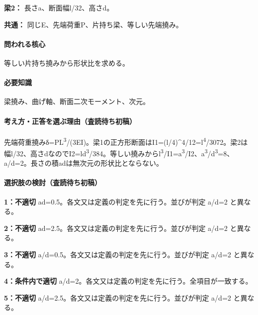 \noindent\textbf{梁2：} 長さa、断面幅l/32、高さd。\par

\noindent\textbf{共通：} 同じE、先端荷重P、片持ち梁、等しい先端撓み。\par

\paragraph{問われる核心} 等しい片持ち撓みから形状比を求める。

\paragraph{必要知識} 梁撓み、曲げ軸、断面二次モーメント、次元。

\paragraph{考え方・正答を選ぶ理由（査読待ち初稿）} 先端荷重撓みδ=PL\textsuperscript{3}/(3EI)。梁1の正方形断面はI1=\allowbreak{}(l/4)\textasciicircum{}4/12=\allowbreak{}l\textsuperscript{4}/3072。梁2は幅l/32、高さdなのでI2=\allowbreak{}ld\textsuperscript{3}/384。等しい撓みからl\textsuperscript{3}/I1=\allowbreak{}a\textsuperscript{3}/I2、a\textsuperscript{3}/d\textsuperscript{3}=8、a/d=\allowbreak{}2。長さの積adは無次元の形状比とならない。

\paragraph{選択肢の検討（査読待ち初稿）}\mbox{}\par

\noindent\textbf{1：不適切} ad=\allowbreak{}0.5。各文又は定義の判定を先に行う。並びが判定 a/d=\allowbreak{}2 と異なる。\par

\noindent\textbf{2：不適切} ad=\allowbreak{}2.5。各文又は定義の判定を先に行う。並びが判定 a/d=\allowbreak{}2 と異なる。\par

\noindent\textbf{3：不適切} a/d=\allowbreak{}0.5。各文又は定義の判定を先に行う。並びが判定 a/d=\allowbreak{}2 と異なる。\par

\noindent\textbf{4：条件内で適切} a/d=\allowbreak{}2。各文又は定義の判定を先に行う。全項目が一致する。\par

\noindent\textbf{5：不適切} a/d=\allowbreak{}2.5。各文又は定義の判定を先に行う。並びが判定 a/d=\allowbreak{}2 と異なる。\par

